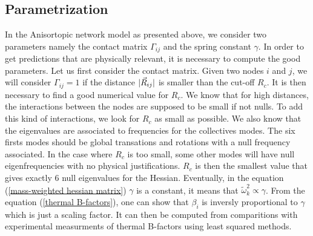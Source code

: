 \subsection{Parametrization}
In the Anisortopic network model as presented above, we consider two parameters namely the contact matrix $\Gamma_{ij}$ and the spring constant $\gamma$. In order to get predictions that are physically relevant, it is necessary to compute the good parameters. Let us first consider the contact matrix. Given two nodes $i$ and $j$, we will consider $\Gamma_{ij} = 1$ if the distance $\vert\vec{R}_{ij}\vert$ is smaller than the cut-off $R_c$. It is then necessary to find a good numerical value for $R_c$. We know that for high distances, the interactions between the nodes are supposed to be small if not nulls. To add this kind of interactions, we look for $R_c$ as small as possible. We also know that the eigenvalues are associated to frequencies for the collectives modes. The six firsts modes should be global transations and rotations with a null frequency associated. In the case where $R_c$ is too small, some other modes will have null eigenfrequencies with no physical justifications. $R_c$ is then the smallest value that gives exactly $6$ null eigenvalues for the Hessian. Eventually, in the equation (\ref{mass-weighted hessian matrix}) $\gamma$ is a constant, it means that $\tilde{\omega}_k^2 \propto \gamma$. From the equation (\ref{thermal B-factors}), one can show that $\beta_i$ is inversly proportional to $\gamma$ which is just a scaling factor. It can then be computed from comparitions with experimental measurments of thermal B-factors using least squared methods.

